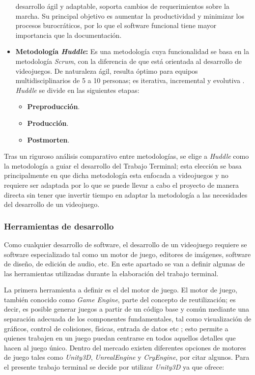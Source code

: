 \begin{itemize}
	desarrollo ágil y adaptable, soporta cambios de requerimientos sobre la marcha. 
	Su principal objetivo es aumentar la productividad y minimizar los procesos 
	burocráticos, por lo que el software funcional tiene mayor importancia que la 
	documentación\cite{Ref_XP}.
	\item \textbf{Metodología \textit{Huddle}:} Es una metodología cuya funcionalidad 
 se basa en la metodología \textit{Scrum}, con la diferencia de que está orientada al
  desarrollo de videojuegos.  De naturaleza ágil, resulta óptimo para equipos 
  multidisciplinarios de 5 a 10 personas; es iterativa, incremental y evolutiva 
  \cite{Ref_Huddle}. \textit{Huddle} se divide en las siguientes etapas:
  	\begin{itemize}
  		\item \textbf{Preproducción}.
		\item \textbf{Producción}.
		\item \textbf{Postmorten}.
  	\end{itemize}
\end{itemize}

Tras un riguroso análisis comparativo entre metodologías, se elige a 
\textit{Huddle}  como la metodología a guiar el desarrollo del Trabajo Terminal; 
esta elección se basa principalmente en que dicha metodología esta enfocada a 
videojuegos y no requiere ser adaptada por lo que se puede llevar a cabo el 
proyecto de manera directa sin tener que invertir tiempo en adaptar la metodología 
a las necesidades del desarrollo de un videojuego.

\subsubsection{Herramientas de desarrollo}
Como cualquier desarrollo de software, el desarrollo de un videojuego requiere 
se software especializado tal como un motor de juego, editores de imágenes, software 
de diseño, de edición de audio, etc. En este apartado se van a definir algunas de 
las herramientas utilizadas durante la elaboración del trabajo terminal.
\\
\par
La primera herramienta a definir es el del motor de juego. El motor de juego, 
también conocido como \textit{Game Engine}, parte del concepto de reutilización; 
es decir, es posible generar juegos a partir de un código base y común mediante una 
separación adecuada de los componentes fundamentales, tal como visualización de 
gráficos, control de colisiones, físicas, entrada de datos etc \cite{Ref:MutorGraf}; 
esto permite a quienes trabajen en un juego puedan centrarse en todos aquellos 
detalles que hacen al juego único. Dentro del mercado existen diferentes 
opciones de motores de juego tales como \textit{Unity3D}, \textit{UnrealEngine} 
y \textit{CryEngine}, por citar algunos. Para el presente trabajo terminal se 
decide por utilizar \textit{Unity3D} ya que ofrece: 

